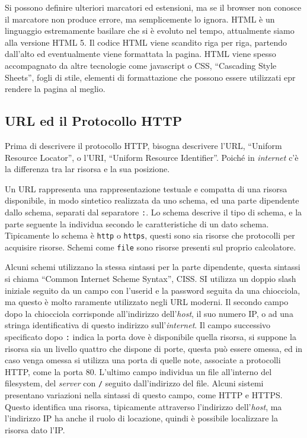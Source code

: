 \documentclass{article}
\numberwithin{equation}{subsection}
\begin{document}
Si possono definire ulteriori marcatori ed estensioni, ma se il browser non conosce il marcatore non produce errore, ma semplicemente lo ignora. 
\textcolor{Peach}{HTML} è un linguaggio estremamente basilare che si è evoluto nel tempo, attualmente siamo alla versione \textcolor{Peach}{HTML} 5. 
Il codice \textcolor{Peach}{HTML} viene scandito riga per riga, partendo dall'alto ed eventualmente viene formattata la pagina. \textcolor{Peach}{HTML} viene spesso accompagnato da altre tecnologie come 
javascript o CSS, ``Cascading Style Sheets'', fogli di stile, elementi di formattazione che possono essere utilizzati epr rendere la pagina al meglio. 

\subsection{URL ed il Protocollo \textcolor{NavyBlue}{HTTP}}

Prima di descrivere il protocollo \textcolor{NavyBlue}{HTTP}, bisogna descrivere l'URL, ``Uniform Resource Locator'', o l'URI, ``Uniform Resource Identifier''. Poiché in \textit{internet} c'è la differenza 
tra lar risorsa e la sua posizione. 

Un URL rappresenta una rappresentazione testuale e compatta di una risorsa disponibile, in modo sintetico realizzata da uno schema, ed una parte dipendente dallo schema, 
separati dal separatore \verb|:|. 
Lo schema descrive il tipo di schema, e la parte seguente la individua secondo le caratteristiche di un dato schema. Tipicamente lo schema è \verb|http| o \verb|https|, 
questi sono sia risorse che protocolli per acquisire risorse. Schemi come \verb|file| sono risorse presenti sul proprio calcolatore. 



Alcuni schemi utilizzano la stessa sintassi per la parte dipendente, questa sintassi si chiama ``Common Internet Scheme Syntax'', CISS. SI utilizza un doppio slash iniziale 
seguito da un campo con l'userid e la password seguita da una chiocciola, ma questo è molto raramente utilizzato negli URL moderni. 
Il secondo campo dopo la chiocciola corrisponde all'indirizzo dell'\textit{host}, il suo numero \textcolor{Bittersweet}{IP}, o ad una stringa identificativa di questo indirizzo sull'\textit{internet}. 
Il campo successivo specificato dopo \verb|:| indica la porta dove è disponibile quella risorsa, si suppone la risorsa sia un livello quattro che dispone di porte, 
questa può essere omessa, ed in caso venga omessa si utilizza una porta di quelle note, associate a protocolli \textcolor{NavyBlue}{HTTP}, come la porta 80. L'ultimo campo individua un file 
all'interno del filesystem, del \textit{server} con \verb|/| seguito dall'indirizzo del file. Alcuni sistemi presentano variazioni nella sintassi di questo campo, come \textcolor{NavyBlue}{HTTP} e 
HTTPS. 
Questo identifica una risorsa, tipicamente attraverso l'indirizzo dell'\textit{host}, ma l'indirizzo \textcolor{Bittersweet}{IP} ha anche il ruolo di locazione, quindi è possibile localizzare la 
risorsa dato l'\textcolor{Bittersweet}{IP}. 
\end{document}
